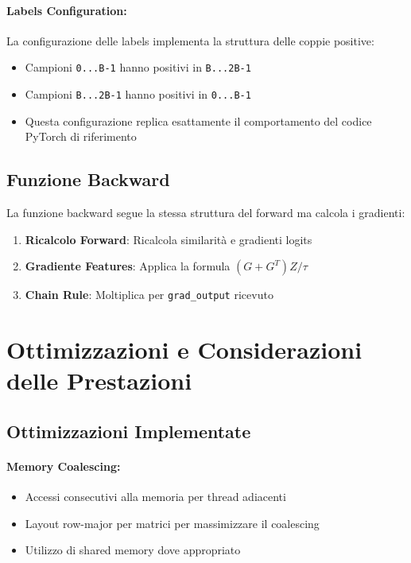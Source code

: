 \documentclass[a4paper,11pt]{article}
\begin{document}
\paragraph{Labels Configuration:}
La configurazione delle labels implementa la struttura delle coppie positive:
\begin{itemize}
    \item Campioni \texttt{0...B-1} hanno positivi in \texttt{B...2B-1}
    \item Campioni \texttt{B...2B-1} hanno positivi in \texttt{0...B-1}
    \item Questa configurazione replica esattamente il comportamento del codice PyTorch di riferimento
\end{itemize}

\subsection{Funzione Backward}

La funzione backward segue la stessa struttura del forward ma calcola i gradienti:

\begin{enumerate}
    \item \textbf{Ricalcolo Forward}: Ricalcola similarità e gradienti logits
    \item \textbf{Gradiente Features}: Applica la formula $(G + G^T) Z / \tau$
    \item \textbf{Chain Rule}: Moltiplica per \texttt{grad\_output} ricevuto
\end{enumerate}

\section{Ottimizzazioni e Considerazioni delle Prestazioni}

\subsection{Ottimizzazioni Implementate}

\paragraph{Memory Coalescing:}
\begin{itemize}
    \item Accessi consecutivi alla memoria per thread adiacenti
    \item Layout row-major per matrici per massimizzare il coalescing
    \item Utilizzo di shared memory dove appropriato
\end{itemize}
\end{document}
